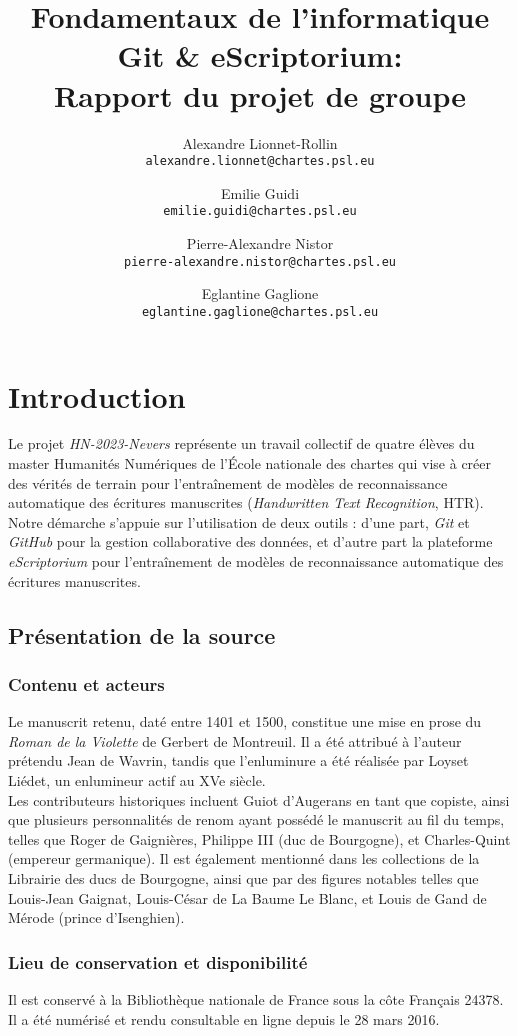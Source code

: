 \documentclass[12pt,a4paper,oneside,titlepage]{article} %
\author{Alexandre Lionnet-Rollin\\
	\texttt{alexandre.lionnet@chartes.psl.eu}\and Emilie Guidi\\
	\texttt{emilie.guidi@chartes.psl.eu}
	\and Pierre-Alexandre Nistor\\
	\texttt{pierre-alexandre.nistor@chartes.psl.eu}\and 
	Eglantine Gaglione\\
	\texttt{eglantine.gaglione@chartes.psl.eu}}
\title{Fondamentaux de l'informatique Git \& eScriptorium: \\
	Rapport du projet de groupe}
\begin{document}
	\maketitle
	
	
	\section{Introduction}
	Le projet \emph{HN-2023-Nevers} représente un travail collectif de quatre élèves du master Humanités Numériques de l'École nationale des chartes qui vise à créer des vérités de terrain pour l'entraînement de modèles de reconnaissance automatique des écritures manuscrites (\emph{Handwritten Text Recognition}, HTR). Notre démarche s'appuie sur l'utilisation de deux outils : d'une part, \emph{Git} et \emph{GitHub} pour la gestion collaborative des données, et d'autre part la plateforme \emph{eScriptorium} pour l'entraînement de modèles de reconnaissance automatique des écritures manuscrites.
	\subsection{Présentation de la source }
	\subsubsection{ Contenu et acteurs}
	Le manuscrit retenu, daté entre 1401 et 1500, constitue une mise en prose du \emph{Roman de la Violette} de Gerbert de Montreuil. Il a été attribué à l'auteur prétendu Jean de Wavrin, tandis que l'enluminure a été réalisée par Loyset Liédet, un enlumineur actif au XVe siècle. \\
	Les contributeurs historiques incluent Guiot d'Augerans en tant que copiste, ainsi que plusieurs personnalités de renom ayant possédé le manuscrit au fil du temps, telles que Roger de Gaignières, Philippe III (duc de Bourgogne), et Charles-Quint (empereur germanique). Il est également mentionné dans les collections de la Librairie des ducs de Bourgogne, ainsi que par des figures notables telles que Louis-Jean Gaignat, Louis-César de La Baume Le Blanc, et Louis de Gand de Mérode (prince d'Isenghien).
	\subsubsection{ Lieu de conservation et disponibilité}
	Il est conservé à la Bibliothèque nationale de France sous la côte Français 24378.  Il a été numérisé et rendu consultable en ligne depuis le 28 mars 2016. 
\end{document}
